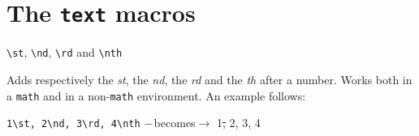 \documentclass[]{notex}
\newcommand{\becomes}[1]{\hspace{#1} $\--$becomes$\rightarrow$ \hspace{#1}}
\begin{document}
\section{The \texttt{text} macros}

\begin{tcolorbox}
    \verb|\st|, \verb|\nd|, \verb|\rd| and \verb|\nth|
\end{tcolorbox}

\noindent Adds respectively the \textit{st}, the \textit{nd}, the \textit{rd} and the \textit{th} after a number. Works both in a \texttt{math} and in a non-\texttt{math} environment. An example follows:
\begin{center}
    \verb|1\st, 2\nd, 3\rd, 4\nth| \becomes{20pt} 1\st, 2\nd, 3\rd, 4\nth
\end{center}
\end{document}
